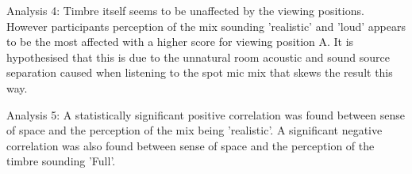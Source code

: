 		Analysis 4: Timbre itself seems to be unaffected by the viewing positions. However participants perception of the mix sounding 'realistic' and 'loud' appears to be the most affected with a higher score for viewing position A. It is hypothesised that this is due to the unnatural room acoustic and sound source separation caused when listening to the spot mic mix that skews the result this way.

		Analysis 5: A statistically significant positive correlation was found between sense of space and the perception of the mix being 'realistic'. A significant negative correlation was also found between sense of space and the perception of the timbre sounding 'Full'.

